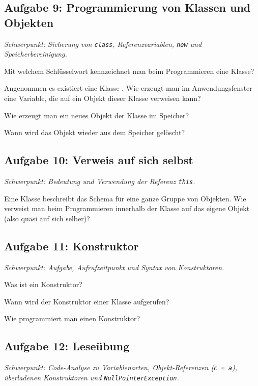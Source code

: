 \subsection{Aufgabe 9: Programmierung von Klassen und Objekten \tagPflicht}
\noindent \emph{Schwerpunkt: Sicherung von \texttt{class}, Referenzvariablen, \texttt{new} und Speicherbereinigung.}

\begin{compactenum}[a)]

\item Mit welchem Schlüsselwort kennzeichnet man beim Programmieren eine
Klasse?
\item Angenommen es existiert eine Klasse . Wie erzeugt man im
Anwendungsfenster eine Variable, die auf ein Objekt dieser Klasse verweisen
kann?
\item Wie erzeugt man ein neues Objekt der Klasse im Speicher?
\item Wann wird das Objekt wieder aus dem Speicher gelöscht?
\end{compactenum}


\subsection{Aufgabe 10: Verweis auf sich selbst \tagPflicht}
\noindent \emph{Schwerpunkt: Bedeutung und Verwendung der Referenz \texttt{this}.}

Eine Klasse beschreibt das Schema für eine ganze Gruppe von Objekten. Wie
verweist man beim Programmieren innerhalb der Klasse auf das eigene Objekt
(also quasi auf sich selber)?


\subsection{Aufgabe 11: Konstruktor \tagPflicht}
\noindent \emph{Schwerpunkt: Aufgabe, Aufrufzeitpunkt und Syntax von Konstruktoren.}

\begin{compactenum}[a)]
\item Was ist ein Konstruktor?
\item Wann wird der Konstruktor einer Klasse aufgerufen?
\item Wie programmiert man einen Konstruktor?
\end{compactenum}


\subsection{Aufgabe 12: Leseübung \tagPflicht}
\noindent \emph{Schwerpunkt: Code-Analyse zu Variablenarten, Objekt-Referenzen (\texttt{c = a}), überladenen Konstruktoren und \texttt{NullPointerException}.}


